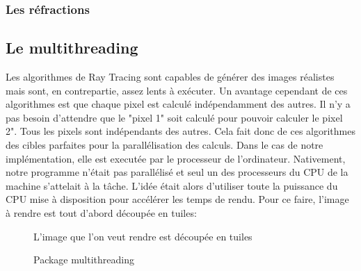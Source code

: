 \documentclass[11pt]{article}
\begin{document}
\subsubsection{Les réfractions}

\subsection{Le multithreading}

Les algorithmes de Ray Tracing sont capables de générer des images réalistes mais sont, en contrepartie, assez lents à exécuter. Un avantage cependant de ces algorithmes est que chaque pixel est calculé indépendamment des autres. Il n'y a pas besoin d'attendre que le "pixel 1" soit calculé pour pouvoir calculer le pixel 2". Tous les pixels sont indépendants des autres. Cela fait donc de ces algorithmes des cibles parfaites pour la parallélisation des calculs. Dans le cas de notre implémentation, elle est executée par le processeur de l'ordinateur. Nativement, notre programme n'était pas parallélisé et seul un des processeurs du CPU de la machine s'attelait à la tâche. L'idée était alors d'utiliser toute la puissance du CPU mise à disposition pour accélérer les temps de rendu. Pour ce faire, l'image à rendre est tout d'abord découpée en tuiles:

\begin{figure}[h!]

	\caption{L'image que l'on veut rendre est découpée en tuiles}
	\label{grilleMultithreading}
\end{figure}
\FloatBarrier

\begin{figure}[h!]

	\caption{Package multithreading}
	\label{packageMultithreading}
\end{figure}
\FloatBarrier
\end{document}
